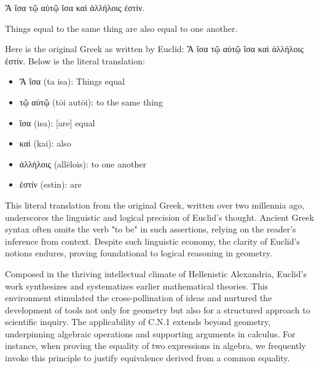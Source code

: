 \begin{cn}
\textgreek{Ἄ ἴσα τῷ αὐτῷ ἴσα καὶ ἀλλήλοις ἐστίν.}

Things equal to the same thing are also equal to one another.
\end{cn}
Here is the original Greek as written by Euclid: \textgreek{Ἄ ἴσα τῷ αὐτῷ ἴσα καὶ ἀλλήλοις ἐστίν.} Below is the literal translation:

\begin{itemize}
\item \textgreek{Ἄ ἴσα (ta isa)}: Things equal
\item \textgreek{τῷ αὐτῷ (tōi autōi)}: to the same thing
\item \textgreek{ἴσα (isa)}: [are] equal
\item \textgreek{καὶ (kai)}: also
\item \textgreek{ἀλλήλοις (allēlois)}: to one another
\item \textgreek{ἐστίν (estin)}: are
\end{itemize}


This literal translation from the original Greek, written over two millennia ago, underscores the linguistic and logical precision of Euclid's thought. Ancient Greek syntax often omits the verb "to be" in such assertions, relying on the reader’s inference from context. Despite such linguistic economy, the clarity of Euclid’s notions endures, proving foundational to logical reasoning in geometry.

Composed in the thriving intellectual climate of Hellenistic Alexandria, Euclid's work synthesizes and systematizes earlier mathematical theories. This environment stimulated the cross-pollination of ideas and nurtured the development of tools not only for geometry but also for a structured approach to scientific inquiry. The applicability of C.N.1 extends beyond geometry, underpinning algebraic operations and supporting arguments in calculus. For instance, when proving the equality of two expressions in algebra, we frequently invoke this principle to justify equivalence derived from a common equality.

\clearpage

